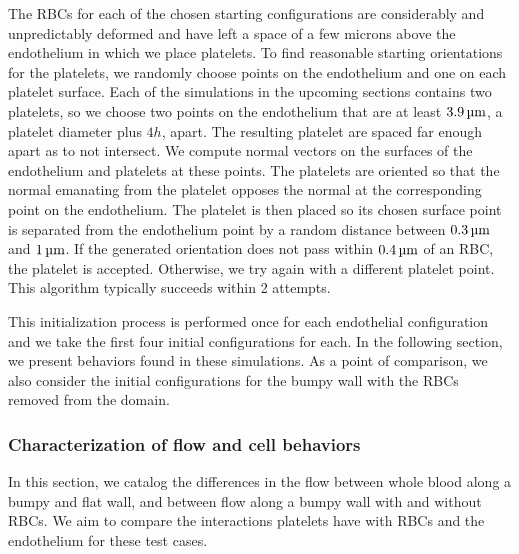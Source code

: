 The RBCs for each of the chosen starting configurations are considerably and
unpredictably deformed and have left a space of a few microns above the endothelium
in which we place platelets. To find reasonable starting orientations for the platelets,
we randomly choose points on the endothelium and one on each platelet surface. Each of
the simulations in the upcoming sections contains two platelets, so we choose two points
on the endothelium that are at least $3.9\um$, a platelet diameter plus $4h$, apart. The
resulting platelet are spaced far enough apart as to not intersect. We compute normal
vectors on the surfaces of the endothelium and platelets at these points. The platelets
are oriented so that the normal emanating from the platelet opposes the normal at the
corresponding point on the endothelium. The platelet is then placed so its chosen surface
point is separated from the endothelium point by a random distance between $0.3\um$ and
$1\um$. If the generated orientation does not pass within $0.4\um$ of an RBC, the
platelet is accepted. Otherwise, we try again with a different platelet point. This
algorithm typically succeeds within 2 attempts.

This initialization process is performed once for each endothelial configuration and we
take the first four initial configurations for each. In the following section, we present
behaviors found in these simulations. As a point of comparison, we also consider the
initial configurations for the bumpy wall with the RBCs removed from the domain.


\subsubsection{Characterization of flow and cell behaviors}

In this section, we catalog the differences in the flow between whole blood along a bumpy
and flat wall, and between flow along a bumpy wall with and without RBCs. We aim to
compare the interactions platelets have with RBCs and the endothelium for these test
cases.

